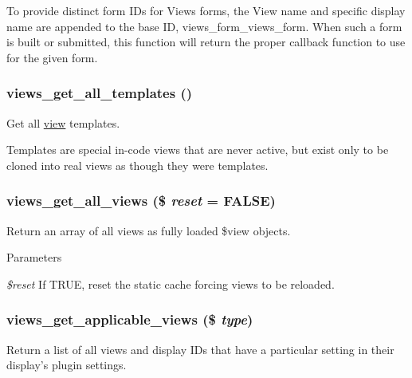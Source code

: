 To provide distinct form IDs for Views forms, the View name and specific display name are appended to the base ID, views\_\-form\_\-views\_\-form. When such a form is built or submitted, this function will return the proper callback function to use for the given form. \hypertarget{views_8module_a1acf51b07678da9f1bbf608f11099e80}{
\subsubsection[{views\_\-get\_\-all\_\-templates}]{\setlength{\rightskip}{0pt plus 5cm}views\_\-get\_\-all\_\-templates ()}}
\label{views_8module_a1acf51b07678da9f1bbf608f11099e80}
Get all \hyperlink{classview}{view} templates.

Templates are special in-\/code views that are never active, but exist only to be cloned into real views as though they were templates. \hypertarget{views_8module_ab1f0b4d2bc5c4a7db19554780f5779ea}{
\subsubsection[{views\_\-get\_\-all\_\-views}]{\setlength{\rightskip}{0pt plus 5cm}views\_\-get\_\-all\_\-views (\$ {\em reset} = {\ttfamily FALSE})}}
\label{views_8module_ab1f0b4d2bc5c4a7db19554780f5779ea}
Return an array of all views as fully loaded \$view objects.


\begin{DoxyParams}{Parameters}
\item[{\em \$reset}]If TRUE, reset the static cache forcing views to be reloaded. \end{DoxyParams}
\hypertarget{views_8module_aa014d34aca90095935b24f3a6f49bb4a}{
\subsubsection[{views\_\-get\_\-applicable\_\-views}]{\setlength{\rightskip}{0pt plus 5cm}views\_\-get\_\-applicable\_\-views (\$ {\em type})}}
\label{views_8module_aa014d34aca90095935b24f3a6f49bb4a}
Return a list of all views and display IDs that have a particular setting in their display's plugin settings.

